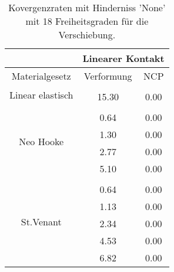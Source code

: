 \begin{table} 
\centering 
\begin{tabular}{c|cc|} 
\cline{2-3} 
 & \multicolumn{2}{|c|}{Linearer Kontakt} \\ 
\hline 
\multicolumn{1}{|c|}{Materialgesetz} & \multicolumn{1}{c|}{Verformung} & \multicolumn{1}{c|}{NCP} \\ 
\hline 
\multicolumn{1}{|c|}{\multirow{2}{*}{Linear elastisch}} &\multicolumn{1}{|c|}{} & \multicolumn{1}{|c|}{} \\ 
\multicolumn{1}{|c|}{} & \multicolumn{1}{|c|}{     15.30} & \multicolumn{1}{|c|}{      0.00} \\ 
\hline 
\multicolumn{1}{|c|}{\multirow{5}{*}{Neo Hooke}} &\multicolumn{1}{|c|}{} & \multicolumn{1}{|c|}{} \\ 
\multicolumn{1}{|c|}{} & \multicolumn{1}{|c|}{      0.64} & \multicolumn{1}{|c|}{      0.00} \\ 
\multicolumn{1}{|c|}{} & \multicolumn{1}{|c|}{      1.30} & \multicolumn{1}{|c|}{      0.00} \\ 
\multicolumn{1}{|c|}{} & \multicolumn{1}{|c|}{      2.77} & \multicolumn{1}{|c|}{      0.00} \\ 
\multicolumn{1}{|c|}{} & \multicolumn{1}{|c|}{      5.10} & \multicolumn{1}{|c|}{      0.00} \\ 
\hline 
\multicolumn{1}{|c|}{\multirow{6}{*}{St.Venant}} &\multicolumn{1}{|c|}{} & \multicolumn{1}{|c|}{} \\ 
\multicolumn{1}{|c|}{} & \multicolumn{1}{|c|}{      0.64} & \multicolumn{1}{|c|}{      0.00} \\ 
\multicolumn{1}{|c|}{} & \multicolumn{1}{|c|}{      1.13} & \multicolumn{1}{|c|}{      0.00} \\ 
\multicolumn{1}{|c|}{} & \multicolumn{1}{|c|}{      2.34} & \multicolumn{1}{|c|}{      0.00} \\ 
\multicolumn{1}{|c|}{} & \multicolumn{1}{|c|}{      4.53} & \multicolumn{1}{|c|}{      0.00} \\ 
\multicolumn{1}{|c|}{} & \multicolumn{1}{|c|}{      6.82} & \multicolumn{1}{|c|}{      0.00} \\ 
\hline 
\end{tabular}\caption{Kovergenzraten mit Hinderniss 'None' mit 18 Freiheitsgraden für die Verschiebung.}\label{tab:Rate_None_level0}
\end{table} 
